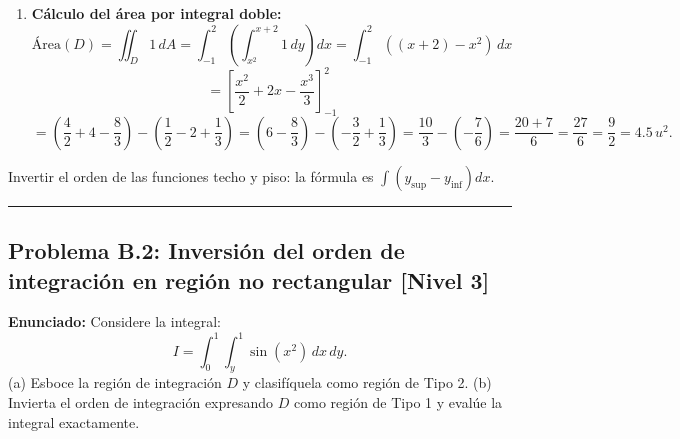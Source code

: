 \documentclass[11pt,a4paper]{article}
\begin{document}
\begin{enumerate}[label=\textbf{\arabic*.}]
\item \textbf{Cálculo del área por integral doble:}
\begin{equation*}
\text{Área}(D) = \iint_D 1 \, dA = \int_{-1}^2 \left( \int_{x^2}^{x+2} 1 \, dy \right) dx = \int_{-1}^2 ((x + 2) - x^2) \, dx
\end{equation*}
\begin{equation*}
= \left[ \frac{x^2}{2} + 2x - \frac{x^3}{3} \right]_{-1}^2
\end{equation*}
\begin{equation*}
= \left( \frac{4}{2} + 4 - \frac{8}{3} \right) - \left( \frac{1}{2} - 2 + \frac{1}{3} \right) = \left(6 - \frac{8}{3}\right) - \left(-\frac{3}{2} + \frac{1}{3}\right) = \frac{10}{3} - \left(-\frac{7}{6}\right) = \frac{20 + 7}{6} = \frac{27}{6} = \frac{9}{2} = 4.5 \, u^2.
\end{equation*}
\end{enumerate}

\begin{trapbox}
Invertir el orden de las funciones techo y piso: la fórmula es $\int (y_{\text{sup}} - y_{\text{inf}}) dx$.
\end{trapbox}

\vspace{0.5cm}
\hrule
\vspace{0.5cm}

\subsection*{Problema B.2: Inversión del orden de integración en región no rectangular \hfill \color{primaryblue}\small[Nivel 3]}

\begin{tcolorbox}[colback=white,colframe=gray!40,arc=1mm,boxrule=0.5pt,left=3mm,right=3mm,top=2mm,bottom=2mm]
\textbf{Enunciado:} Considere la integral:
\begin{equation*}
I = \int_0^1 \int_y^1 \sin(x^2) \, dx \, dy.
\end{equation*}
(a) Esboce la región de integración $D$ y clasifíquela como región de Tipo 2. (b) Invierta el orden de integración expresando $D$ como región de Tipo 1 y evalúe la integral exactamente.
\end{tcolorbox}
\end{document}
